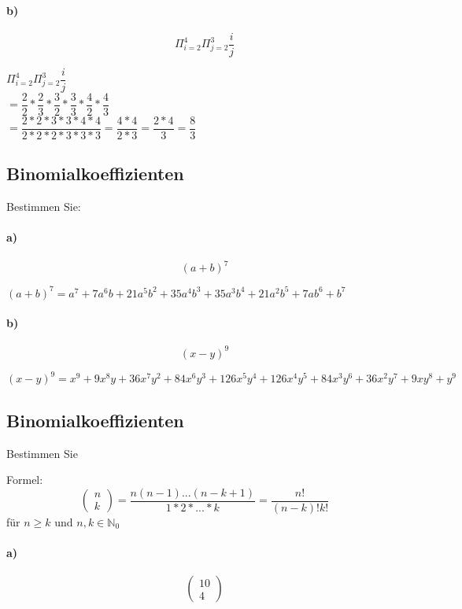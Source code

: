 \documentclass[paper=a4, fontsize=11pt]{scrartcl}
\numberwithin{equation}{section}
\numberwithin{figure}{section}
\numberwithin{table}{section}
\begin{document}
\paragraph{b)}
$$\Pi^{4}_{i=2} \Pi^{3}_{j=2} \dfrac{i}{j}$$

$\Pi^{4}_{i=2} \Pi^{3}_{j=2} \dfrac{i}{j}$ \\
$= \dfrac{2}{2} * \dfrac{2}{3}
* \dfrac{3}{2} * \dfrac{3}{3} 
* \dfrac{4}{2} * \dfrac{4}{3}$ \\
$= \dfrac{2*2*3*3*4*4}{2*2*2*3*3*3}
= \dfrac{4*4}{2*3}
= \dfrac{2*4}{3}
= \dfrac{8}{3}$
\subsection{Binomialkoeffizienten}
Bestimmen Sie:
\paragraph{a)}
$$(a+b)^{7}$$

$(a+b)^{7}=a^{7}+7a^{6}b+21a^{5}b^{2}+35a^{4}b^{3}+35a^{3}b^{4}+21a^{2}b^{5}+7ab^{6}+b^{7}$
\paragraph{b)}
$$(x-y)^{9}$$

$(x-y)^{9}=x^{9}+9x^{8}y+36x^{7}y^{2}+84x^{6}y^{3}+126x^{5}y^{4}+126x^{4}y^{5}+84x^{3}y^{6}+36x^{2}y^{7}+9xy^{8}+y^{9}$
\subsection{Binomialkoeffizienten}
Bestimmen Sie

Formel: $$\left(\begin{array}{c} n \\ k \end{array}\right)
= \dfrac{n(n-1) ... (n-k+1)}{1*2*... *k}
= \dfrac{n!}{(n-k)!k!}$$ für $n \geq k$ und $n,k \in \mathbb{N}_{0}$

\paragraph{a)}
$$\left(\begin{array}{c} 10 \\ 4 \end{array}\right)$$
\end{document}
